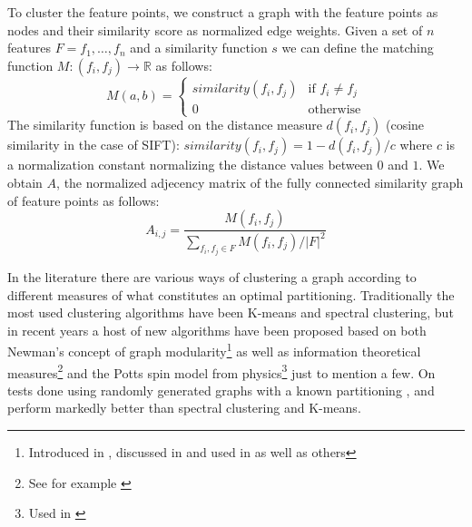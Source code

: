 To cluster the feature points, we construct a graph with the feature 
points as nodes and their similarity score as normalized edge weights.  
Given a set of $n$ features $F = {f_1, \ldots, f_n}$ and a similarity 
function $s$ we can define the matching function $M : (f_i, f_j) 
\rightarrow \mathbb{R}$ as follows:
\begin{equation*}
    M(a,b) = \begin{cases} similarity(f_i, f_j) & \mbox{if } f_i \neq 
    f_j \\ 0 & \mbox{otherwise}
	\end{cases}
\end{equation*}
The similarity function is based on the distance measure $d(f_i,f_j)$ 
(cosine similarity in the case of SIFT): $similarity(f_i, f_j) = 1 - 
d(f_i,f_j) / c$ where $c$ is a normalization constant normalizing the 
distance values between $0$ and $1$.
We obtain $A$, the normalized adjecency matrix of the fully connected 
similarity graph of feature points as follows:
\begin{equation*}
    A_{i,j} = \frac{M(f_i, f_j)}{\sum\limits_{f_i,f_j \in F} M(f_i, f_j) 
    / \left\vert F \right\vert ^ {2}}
\end{equation*}

In the literature there are various ways of clustering a graph according 
to different measures of what constitutes an optimal partitioning. 
Traditionally the most used clustering algorithms have been K-means and 
spectral clustering, but in recent years a host of new algorithms have 
been proposed based on both Newman's concept of graph 
modularity\footnote{Introduced in \cite{girvan2002}, discussed in 
\cite{brandes2007} and used in \cite{blondel2008} as well as others} as 
well as information theoretical measures\footnote{See for example 
\cite{rosvall2008}} and the Potts spin model from physics\footnote{Used 
in \cite{ronhovde2009}} just to mention a few. On tests done using 
randomly generated graphs with a known partitioning \cite{blondel2008}, 
\cite{rosvall2008} and \cite{ronhovde2009} perform markedly better than 
spectral clustering and K-means\cite{lancichinetti2009}.


